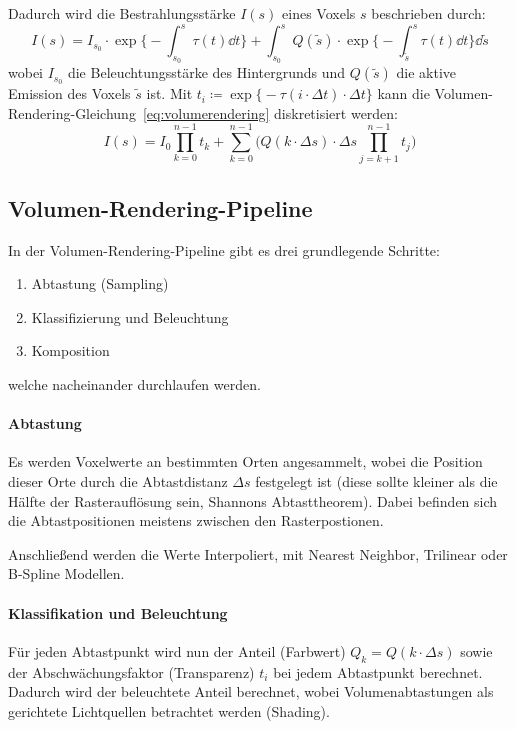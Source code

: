 			Dadurch wird die Bestrahlungsstärke \( I(s) \) eines Voxels \(s\) beschrieben durch:
			\begin{equation}
				I(s) = I_{s_0} \cdot \exp \Bigg\{ -\int_{s_0}^{s} \! \tau(t) \dd{t} \Bigg\} + \int_{s_0}^{s} \! Q(\tilde{s}) \cdot \exp \Bigg\{ -\int_{\tilde{s}}^{s} \tau(t) \dd{t} \Bigg\} \dd{\tilde{s}}  \label{eq:volumerendering}
			\end{equation}
			wobei \( I_{s_0} \) die Beleuchtungsstärke des Hintergrunds und \( Q(\tilde{s}) \) die aktive Emission des Voxels \( \tilde{s} \) ist. Mit \( t_i \coloneqq \exp\Big\{ -\tau(i \cdot \Delta t) \cdot \Delta t \Big\} \) kann die Volumen-Rendering-Gleichung~\eqref{eq:volumerendering} diskretisiert werden:
			\begin{equation}
				I(s) = I_0 \prod_{k = 0}^{n - 1} t_k + \sum_{k = 0}^{n - 1} \Bigg( Q(k \cdot \Delta s) \cdot \Delta s \prod_{j = k + 1}^{n - 1} t_j \Bigg)  \label{eq:volumerenderingdiscrete}
			\end{equation}

		\subsection{Volumen-Rendering-Pipeline}
			In der Volumen-Rendering-Pipeline gibt es drei grundlegende Schritte:
			\begin{enumerate}
				\item Abtastung (Sampling)
				\item Klassifizierung und Beleuchtung
				\item Komposition
			\end{enumerate}
			welche nacheinander durchlaufen werden.

			\paragraph{Abtastung}
				Es werden Voxelwerte an bestimmten Orten angesammelt, wobei die Position dieser Orte durch die Abtastdistanz \( \Delta s \) festgelegt ist (diese sollte kleiner als die Hälfte der Rasterauflösung sein, Shannons Abtasttheorem). Dabei befinden sich die Abtastpositionen meistens zwischen den Rasterpostionen.

				Anschließend werden die Werte Interpoliert, \bspw mit Nearest Neighbor, Trilinear oder B-Spline Modellen.

			\paragraph{Klassifikation und Beleuchtung}
				Für jeden Abtastpunkt wird nun der Anteil (Farbwert) \( Q_k = Q(k \cdot \Delta s) \) sowie der Abschwächungsfaktor (Transparenz) \( t_i \) bei jedem Abtastpunkt berechnet. Dadurch wird der beleuchtete Anteil berechnet, wobei Volumenabtastungen als gerichtete Lichtquellen betrachtet werden (Shading).

